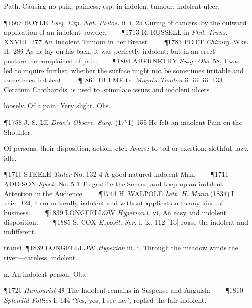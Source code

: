 \begin{description}[wide, labelwidth=!, labelindent=0pt]
\noindent {}

\vspace{-0.3cm}

\begin{myenumerate}

 Path. Causing no pain, painless; esp. in indolent tumour, indolent ulcer.

\P 1663 BOYLE  \textit{Usef. Exp. Nat. Philos.} ii. i. 25 Curing of cancers..by the outward application of an indolent powder.    
\P 1713 R. RUSSELL in  \textit{Phil. Trans.} XXVIII. 277 An Indolent Tumour in her Breast.    
\P 1783 POTT  \textit{Chirurg.} Wks. II. 286 As he lay on his back, it was perfectly indolent; but in an erect posture..he complained of pain.    
\P 1804 ABERNETHY  \textit{Surg. Obs.} 58, I was led to inquire further, whether the surface might not be sometimes irritable and sometimes indolent.    
\P 1861 HULME tr.  \textit{Moquin-Tandon} ii. iii. iii. 133 Ceratum Cantharidis..is used to..stimulate issues and indolent ulcers.

 loosely. Of a pain: Very slight. Obs.

\P 1758 J. S. LE  \textit{Dran's Observ. Surg.} (1771) 155 He felt an indolent Pain on the Shoulder.

 Of persons, their disposition, action, etc.: Averse to toil or exertion; slothful, lazy, idle.

\P 1710 STEELE  \textit{Tatler} No. 132 4 A good-natured indolent Man.    
\P 1711 ADDISON  \textit{Spect.} No. 5 1 To gratifie the Senses, and keep up an indolent Attention in the Audience.    
\P 1744 H. WALPOLE  \textit{Lett. H. Mann} (1834) I. xciv. 324, I am naturally indolent and without application to any kind of business.    
\P 1839 LONGFELLOW  \textit{Hyperion} i. vi, An easy and indolent disposition.    
\P 1885 S. COX  \textit{Exposit. Ser.} i. ix. 112 [To] rouse the indolent and indifferent.

\noindent transf. \P 1839 LONGFELLOW  \textit{Hyperion} iii. i, Through the meadow winds the river—careless, indolent.

 n. An indolent person. Obs.

\P 1720 \textit{Humourist}  49 The Indolent remains in Suspense and Anguish.    
\P 1810 \textit{Splendid  Follies} I. 144 ‘Yes, yes, I see her’, replied the fair indolent.


\end{myenumerate}
\end{description}
